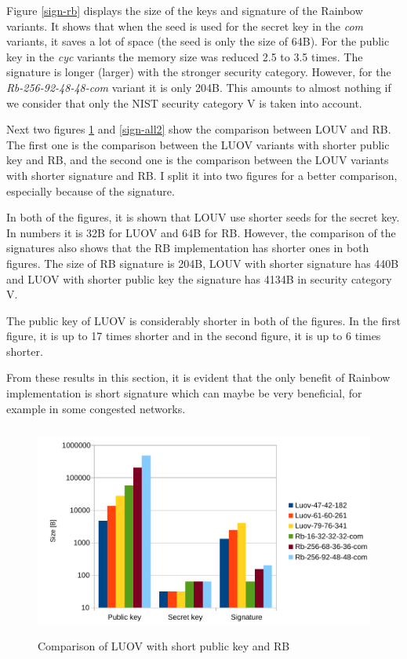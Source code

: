 \documentclass[thesis=M,english]{FITthesis}[2019/12/23]
\begin{document}
\noindent
Figure \ref{sign-rb} displays the size of the keys and signature of the Rainbow variants. It shows that when the seed is used for the secret key in the \textit{com} variants, it saves a lot of space (the seed is only the size of 64B). For the public key in the \textit{cyc} variants the memory size was reduced 2.5 to 3.5 times. The signature is longer (larger) with the stronger security category. However, for the \textit{Rb-256-92-48-48-com} variant it is only 204B. This amounts to almost nothing if we consider that only the NIST security category V is taken into account. 

\bigskip
\noindent
Next two figures \ref{sign-all1} and \ref{sign-all2} show the comparison between LOUV and RB. The first one is the comparison between the LUOV variants with shorter public key and RB, and the second one is the comparison between the LOUV variants with shorter signature and RB. I split it into two figures for a better comparison, especially because of the signature.

\bigskip
\noindent
In both of the figures, it is shown that LOUV use shorter seeds for the secret key. In numbers it is 32B for LUOV and 64B for RB. However, the comparison of the signatures also shows that the RB implementation has shorter ones in both figures. The size of RB signature is 204B, LOUV with shorter signature has 440B and LUOV with shorter public key the signature has 4134B in security category V. 

\bigskip
\noindent
The public key of LUOV is considerably shorter in both of the figures. In the first figure, it is up to 17 times shorter and in the second figure, it is up to 6 times shorter.

\bigskip
\noindent
From these results in this section, it is evident that the only benefit of Rainbow implementation is short signature which can maybe be very beneficial, for example in some congested networks.

\begin{figure}[H]
\centering
\includegraphics[width=13cm,height=7cm]{images/mem-sign-all1.pdf}
\caption{Comparison of LUOV with short public key and RB}
\label{sign-all1}
\end{figure}
\end{document}
